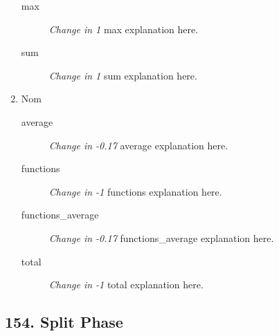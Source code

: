 \begin{enumerate}
\begin{description}
          \item [max] \textit{Change in 1} max explanation here.
          \item [sum] \textit{Change in 1} sum explanation here.
        \end{description}
  \item Nom
        \begin{description}
          \item [average] \textit{Change in -0.17} average explanation here.
          \item [functions] \textit{Change in -1} functions explanation here.
          \item [functions\_average] \textit{Change in -0.17} functions\_average explanation here.
          \item [total] \textit{Change in -1} total explanation here.
        \end{description}
\end{enumerate}
\subsection{ 154.  Split Phase }

